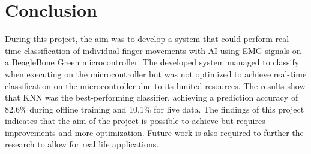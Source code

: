 \section{Conclusion}
During this project, the aim was to develop a system that could perform real-time classification of individual finger movements with AI using EMG signals on a BeagleBone Green microcontroller. The developed system managed to classify when executing on the microcontroller but was not optimized to achieve real-time classification on the microcontroller due to its limited resources. 
The results show that KNN was the best-performing classifier, achieving a prediction accuracy of 82.6\% during offline training and 10.1\% for live data.
The findings of this project indicates that the aim of the project is possible to achieve but requires improvements and more optimization. Future work is also required to further the research to allow for real life applications.






